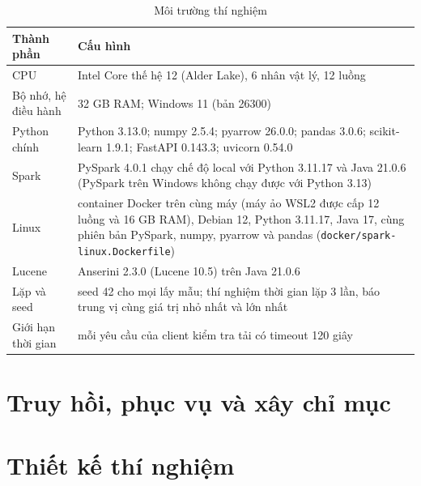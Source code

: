 \documentclass[11pt,a4paper,oneside]{report}
\newcommand{\code}[1]{\texttt{#1}}
\begin{document}
\begin{table}[htbp]
\centering
\caption{Môi trường thí nghiệm}\label{tab:env}
\begin{tabularx}{\linewidth}{@{}lX@{}}
\toprule
Thành phần & Cấu hình \\
\midrule
CPU & Intel Core thế hệ 12 (Alder Lake), 6 nhân vật lý, 12 luồng \\
Bộ nhớ, hệ điều hành & 32 GB RAM; Windows 11 (bản 26300) \\
Python chính & Python 3.13.0; numpy 2.5.4; pyarrow 26.0.0; pandas 3.0.6; scikit-learn 1.9.1; FastAPI 0.143.3; uvicorn 0.54.0 \\
Spark & PySpark 4.0.1 chạy chế độ local với Python 3.11.17 và Java 21.0.6 (PySpark trên Windows không chạy được với Python 3.13) \\
Linux & container Docker trên cùng máy (máy ảo WSL2 được cấp 12 luồng và 16 GB RAM), Debian 12, Python 3.11.17, Java 17, cùng phiên bản PySpark, numpy, pyarrow và pandas (\code{docker/spark-linux.Dockerfile}) \\
Lucene & Anserini 2.3.0 (Lucene 10.5) trên Java 21.0.6 \\
Lặp và seed & seed 42 cho mọi lấy mẫu; thí nghiệm thời gian lặp 3 lần, báo trung vị cùng giá trị nhỏ nhất và lớn nhất \\
Giới hạn thời gian & mỗi yêu cầu của client kiểm tra tải có timeout 120 giây \\
\bottomrule
\end{tabularx}
\end{table}

\FloatBarrier
\section{Truy hồi, phục vụ và xây chỉ mục}















\clearpage
\section{Thiết kế thí nghiệm}
\end{document}
